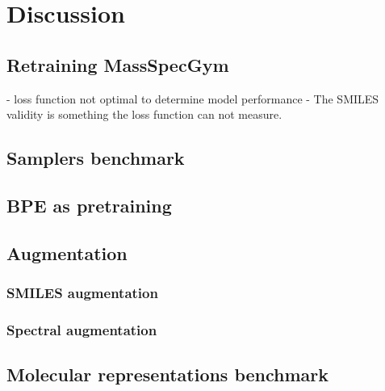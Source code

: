 \chapter{Discussion}
\label{chap:discussion}


\section{Retraining MassSpecGym}
- loss function not optimal to determine model performance
- The SMILES validity is something the loss function can not measure.

\section{Samplers benchmark}


\section{\ac{BPE} as pretraining}


\section{Augmentation}

\subsection{SMILES augmentation}

\subsection{Spectral augmentation}


\section{Molecular representations benchmark}